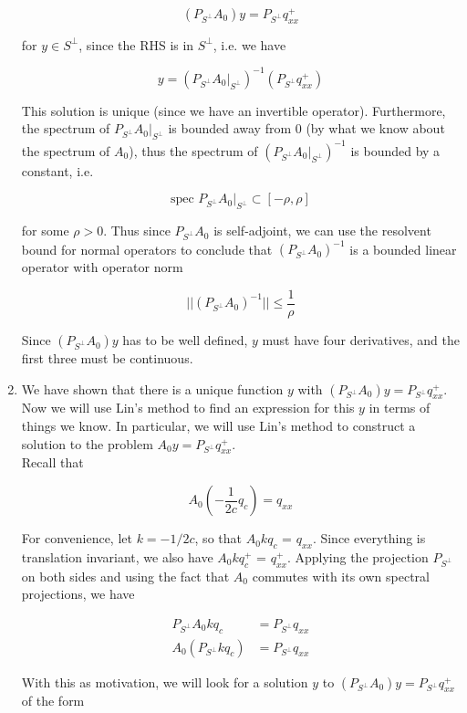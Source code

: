 \documentclass[12pt]{article}
\begin{document}
\begin{enumerate}
\[
(P_{S^\perp} A_0) y = P_{S^\perp} q^+_{xx}
\]

for $y \in S^\perp$, since the RHS is in $S^\perp$, i.e. we have

\[
y = (P_{S^\perp} A_0 |_{S^\perp})^{-1} (P_{S^\perp} q^+_{xx})
\]

This solution is unique (since we have an invertible operator). Furthermore, the spectrum of $P_{S^\perp} A_0 |_{S^\perp}$ is bounded away from 0 (by what we know about the spectrum of $A_0$), thus the spectrum of $(P_{S^\perp} A_0 |_{S^\perp})^{-1}$ is bounded by a constant, i.e. 

\[
\text{spec } P_{S^\perp} A_0 |_{S^\perp}  \subset [-\rho, \rho]
\]

for some $\rho > 0$. Thus since $P_{S^\perp} A_0$ is self-adjoint, we can use the resolvent bound for normal operators to conclude that $(P_{S^\perp} A_0)^{-1}$ is a bounded linear operator with operator norm

\[
|| (P_{S^\perp} A_0)^{-1} || \leq \frac{1}{\rho}
\]

Since $(P_{S^\perp} A_0) y$ has to be well defined, $y$ must have four derivatives, and the first three must be continuous.

\item We have shown that there is a unique function $y$ with $(P_{S^\perp} A_0) y = P_{S^\perp} q^+_{xx}$. Now we will use Lin's method to find an expression for this $y$ in terms of things we know. In particular, we will use Lin's method to construct a solution to the problem $A_0 y = P_{S^\perp} q^+_{xx}$.\\

Recall that

\begin{equation*}
A_0 \left( -\frac{1}{2c} q_c \right) = q_{xx}
\end{equation*}

For convenience, let $k = -1/2c$, so that $A_0 k q_c$ = $q_{xx}$. Since everything is translation invariant, we also have $A_0 k q^+_c$ = $q^+_{xx}$. Applying the projection $P_{S^\perp}$ on both sides and using the fact that $A_0$ commutes with its own spectral projections, we have

\begin{align*}
P_{S^\perp} A_0 k q_c &= P_{S^\perp} q_{xx} \\
A_0 (P_{S^\perp} k q_c) &= P_{S^\perp} q_{xx}
\end{align*}

With this as motivation, we will look for a solution $y$ to $(P_{S^\perp} A_0) y = P_{S^\perp} q^+_{xx}$ of the form


\end{enumerate}
\end{document}
